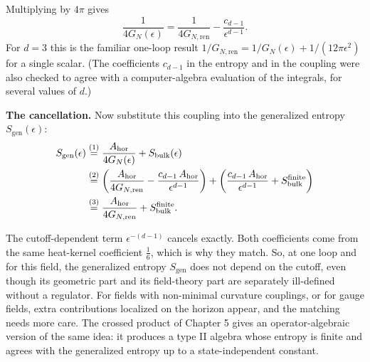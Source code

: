 Multiplying by $4\pi$ gives
\[
\frac{1}{4G_N(\epsilon)} = \frac{1}{4G_{N,\text{ren}}} - \frac{c_{d-1}}{\epsilon^{d-1}} .
\]
For $d=3$ this is the familiar one-loop result $1/G_{N,\text{ren}}=1/G_N(\epsilon)+1/(12\pi\epsilon^2)$ for a
single scalar. (The coefficients $c_{d-1}$ in the entropy and in the coupling were also checked to agree with
a computer-algebra evaluation of the integrals, for several values of $d$.)

\textbf{The cancellation.} Now substitute this coupling into the generalized entropy $S_{\text{gen}}(\epsilon)$:
\begin{align}
S_{\text{gen}}(\epsilon) &\overset{(1)}{=} \frac{A_{\text{hor}}}{4G_N(\epsilon)} + S_{\text{bulk}}(\epsilon) \notag\\
&\overset{(2)}{=} \left(\frac{A_{\text{hor}}}{4G_{N,\text{ren}}} - \frac{c_{d-1}\,A_{\text{hor}}}{\epsilon^{d-1}}\right)
+ \left(\frac{c_{d-1}\,A_{\text{hor}}}{\epsilon^{d-1}} + S_{\text{bulk}}^{\text{finite}}\right) \notag\\
&\overset{(3)}{=} \frac{A_{\text{hor}}}{4G_{N,\text{ren}}} + S_{\text{bulk}}^{\text{finite}} . \notag
\end{align}
\quad
{}\quad
{}

The cutoff-dependent term $\epsilon^{-(d-1)}$ cancels exactly. Both coefficients come from the same heat-kernel
coefficient $\tfrac16$, which is why they match. So, at one loop and for this field, the generalized entropy
$S_{\text{gen}}$ does not depend on the cutoff, even though its geometric part and its field-theory part are
separately ill-defined without a regulator. For fields with non-minimal curvature couplings, or for gauge fields,
extra contributions localized on the horizon appear, and the matching needs more care. The crossed product of
Chapter 5 gives an operator-algebraic version of the same idea: it produces a type II algebra whose entropy is
finite and agrees with the generalized entropy up to a state-independent constant.

